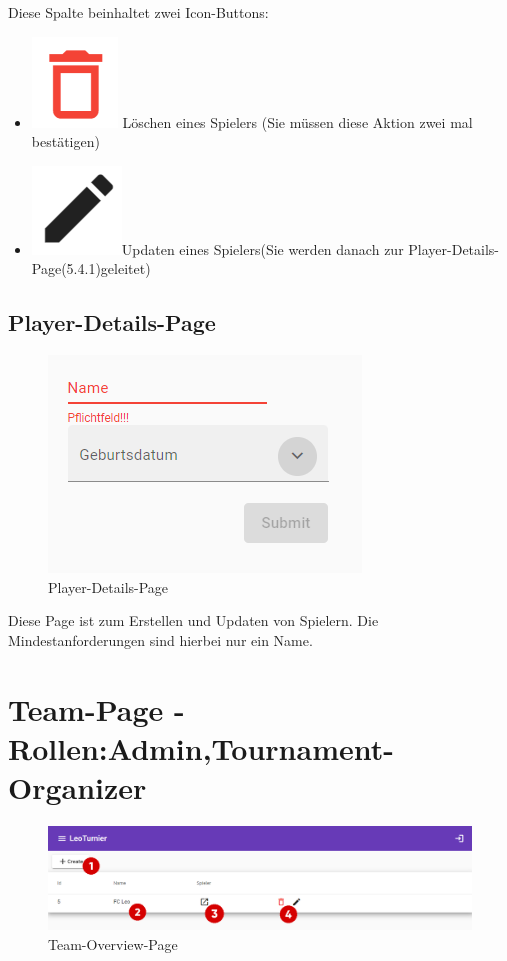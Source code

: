 Diese Spalte beinhaltet zwei Icon-Buttons:
\begin{itemize}
    \item \includegraphics[scale=0.3]{pics/user-guide/delete-icon.PNG} Löschen eines Spielers (Sie müssen diese Aktion zwei mal bestätigen)
    \item\includegraphics[scale=0.3]{pics/user-guide/edit-icon.PNG}Updaten eines Spielers(Sie werden danach zur Player-Details-Page(5.4.1)geleitet)
\end{itemize}
\subsection{Player-Details-Page}
\begin{figure}[H]
    \includegraphics[scale=0.8]{pics/user-guide/player-create-page.PNG}
    \caption{Player-Details-Page}
\end{figure}

Diese Page ist zum Erstellen und Updaten von Spielern. Die Mindestanforderungen sind hierbei nur ein Name.


\section{Team-Page - Rollen:Admin,Tournament-Organizer}
\begin{figure}[H]
    \includegraphics[scale=0.44]{pics/user-guide/team-overview-page.PNG}
    \caption{Team-Overview-Page}
\end{figure}
\bigskip

